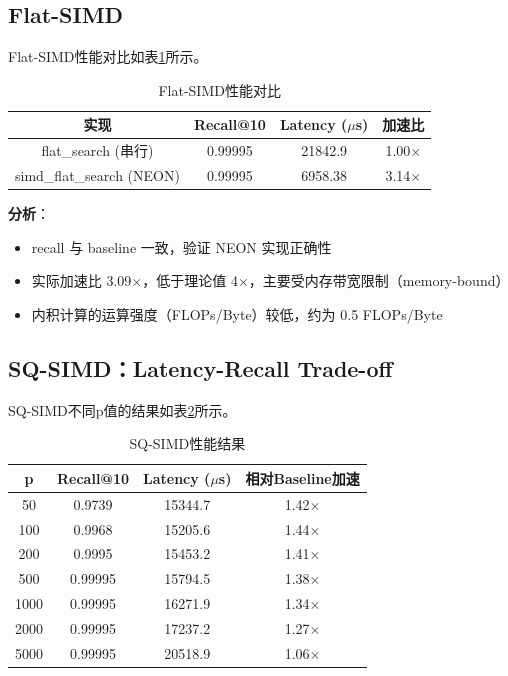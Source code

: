 \documentclass[a4paper]{article}
\begin{document}
\subsection{Flat-SIMD}

Flat-SIMD性能对比如表\ref{table:flat_results}所示。

\begin{table}[!htbp]
  \centering
  \begin{tabular}{cccc}
  \toprule  
  \textbf{实现} & \textbf{Recall@10} & \textbf{Latency ($\mu$s)} & \textbf{加速比} \\
  \midrule
  flat\_search (串行) & 0.99995 & 21842.9 & 1.00$\times$ \\
  simd\_flat\_search (NEON) & 0.99995 & 6958.38 & 3.14$\times$ \\
  \bottomrule
  \end{tabular}
  \caption{Flat-SIMD性能对比}
  \label{table:flat_results}
\end{table}

\textbf{分析}：
\begin{itemize}
  \item recall 与 baseline 一致，验证 NEON 实现正确性
  \item 实际加速比 3.09$\times$，低于理论值 4$\times$，主要受内存带宽限制（memory-bound）
  \item 内积计算的运算强度（FLOPs/Byte）较低，约为 0.5 FLOPs/Byte
\end{itemize}

\subsection{SQ-SIMD：Latency-Recall Trade-off}

SQ-SIMD不同p值的结果如表\ref{table:sq_results}所示。

\begin{table}[!htbp]
  \centering
  \begin{tabular}{cccc}
  \toprule  
  \textbf{p} & \textbf{Recall@10} & \textbf{Latency ($\mu$s)} & \textbf{相对Baseline加速} \\
  \midrule
  50 & 0.9739 & 15344.7 & 1.42$\times$ \\
  100 & 0.9968 & 15205.6 & 1.44$\times$ \\
  200 & 0.9995 & 15453.2 & 1.41$\times$ \\
  500 & 0.99995 & 15794.5 & 1.38$\times$ \\
  1000 & 0.99995 & 16271.9 & 1.34$\times$ \\
  2000 & 0.99995 & 17237.2 & 1.27$\times$ \\
  5000 & 0.99995 & 20518.9 & 1.06$\times$ \\
  \bottomrule
  \end{tabular}
  \caption{SQ-SIMD性能结果}
  \label{table:sq_results}
\end{table}
\end{document}
